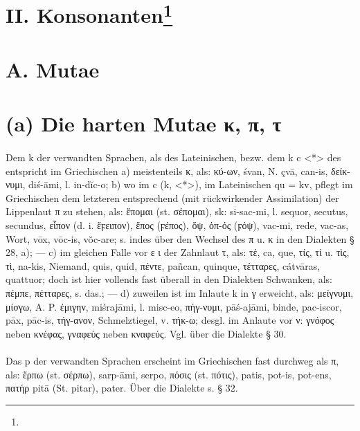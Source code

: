 \section*{II. Konsonanten\protect\footnote{}}

\section*{A. Mutae}

\section{(a) Die harten Mutae κ, π, τ}


\paragraph{} Dem k der verwandten Sprachen, als des Lateinischen, bezw. dem k
c <*> des  entspricht im Griechischen a) meistenteils κ, als:
κύ-ων,  śvan, N. çvā,  can-is, δείκ-νυμι,  diś-āmi, l.
in-dĭc-o; b) wo im  c (k, <*>), im Lateinischen qu = kv, pflegt
im Griechischen dem letzteren entsprechend (mit rückwirkender Assimilation) der
Lippenlaut π zu stehen, als: ἕπομαι (st. σέπομαι), sk: si-sac-mi, l.
sequor, secutus, secundus, εἶπον (d. i. ἔϝειπον), ἔπος (ϝέπος), ὄψ, ὀπ-ός (ϝόψ),
 vac-mi, rede, vac-as, Wort,  vōx, vōc-is, vŏc-are; s. indes
über den Wechsel des π u. κ in den Dialekten § 28, a); — c) im gleichen Falle
vor ε ι der Zahnlaut τ, als: τέ,  ca,  que, τίς, τί u. τὶς, τὶ, 
na-kis, Niemand,  quis, quid, πέντε, pañcan,  quinque, τέτταρες, 
cátvāras,  quattuor; doch ist hier vollends fast überall in den
Dialekten Schwanken, als: πέμπε, πέτταρες, s. das.; — d) zuweilen ist im Inlaute
k in γ erweicht, als: μείγνυμι, μίσγω, A. P. ἐμιγην,  miśrajāmi, l.
misc-eo, πήγ-νυμι,  pāś-ajāmi, binde,  pac-iscor, pāx, pāc-is,
τήγ-ανον, Schmelztiegel, v. τήκ-ω; desgl. im Anlaute vor ν: γνόφος neben κνέφας,
γναφεύς neben κναφεύς. Vgl. über die Dialekte § 30.

\paragraph{} Das p der verwandten Sprachen erscheint im Griechischen fast
durchweg als π, als: ἕρπω (st. σέρπω),  sarp-āmi,  serpo, πόσις (st.
πότις),  patis,  pot-is, pot-ens, πατήρ  pitā (St. pitar),  pater.
Über die Dialekte s. § 32.

